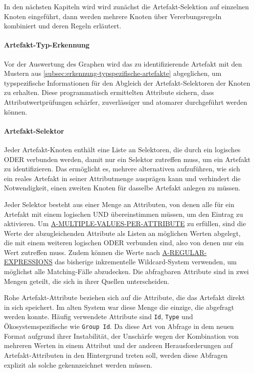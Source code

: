 In den nächsten Kapiteln wird wird zunächst die Artefakt-Selektion auf einzelnen Knoten eingeführt, dann werden mehrere Knoten über Vererbungsregeln kombiniert und deren Regeln erläutert.

\paragraph{Artefakt-Typ-Erkennung}

Vor der Auswertung des Graphen wird das zu identifizierende Artefakt mit den Mustern aus \autoref{subsec:erkennung-typspezifische-artefakte} abgeglichen, um typspezifische Informationen für den Abgleich der Artefakt-Selektoren der Knoten zu erhalten.
Diese programmatisch ermittelten Attribute sichern, dass Attributwertprüfungen schärfer, zuverlässiger und atomarer durchgeführt werden können.

\paragraph{Artefakt-Selektor}

Jeder Artefakt-Knoten enthält eine Liste an Selektoren, die durch ein logisches ODER verbunden werden, damit nur ein Selektor zutreffen muss, um ein Artefakt zu identifizieren.
Das ermöglicht es, mehrere alternativen aufzuführen, wie sich ein reales Artefakt in seiner Attributmenge ausprägen kann und verhindert die Notwendigkeit, einen zweiten Knoten für dasselbe Artefakt anlegen zu müssen.

Jeder Selektor besteht aus einer Menge an Attributen, von denen alle für ein Artefakt mit einem logischen UND übereinstimmen müssen, um den Eintrag zu aktivieren.
Um \hyperref[subsec:req-multiple-attribute-values]{A-MULTIPLE-VALUES-PER-ATTRIBUTE} zu erfüllen, sind die Werte der abzugleichenden Attribute als Listen an möglichen Werten abgelegt, die mit einem weiteren logischen ODER verbunden sind, also von denen nur ein Wert zutreffen muss.
Zudem können die Werte nach \hyperref[subsec:req-regex-support]{A-REGULAR-EXPRESSIONS} das bisherige inkrementelle Wildcard-System verwenden, um möglichst alle Matching-Fälle abzudecken.
Die abfragbaren Attribute sind in zwei Mengen geteilt, die sich in ihrer Quellen unterscheiden.

Rohe Artefakt-Attribute beziehen sich auf die Attribute, die das Artefakt direkt in sich speichert.
Im alten System war diese Menge die einzige, die abgefragt werden konnte.
Häufig verwendete Attribute sind \texttt{Id}, \texttt{Type} und Ökosystemspezifische wie \texttt{Group Id}.
Da diese Art von Abfrage in dem neuen Format aufgrund ihrer Instabilität, der Unschärfe wegen der Kombination von mehreren Werten in einem Attribut und der anderen Herausforderungen auf Artefakt-Attributen in den Hintergrund treten soll, werden diese Abfragen explizit als solche gekennzeichnet werden müssen.

